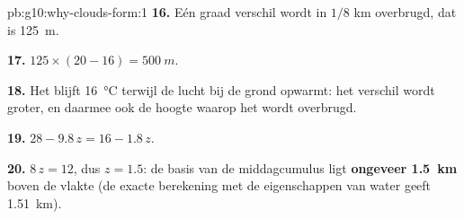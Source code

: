 \begin{solution}{pb:g10:why-clouds-form:1}
\textbf{16.} Eén graad verschil wordt in $1/8$ km overbrugd, dat is
\qty{125}{m}.

\textbf{17.} $125 \times (20 - 16) = \qty{500}{m}$.

\textbf{18.} Het  blijft \qty{16}{\degreeCelsius} terwijl de lucht bij
de grond opwarmt: het verschil wordt groter, en daarmee ook de hoogte waarop het
wordt overbrugd.

\textbf{19.} $28 - 9.8\,z = 16 - 1.8\,z$.

\textbf{20.} $8\,z = 12$, dus $z = 1.5$: de basis van de middagcumulus ligt
\textbf{ongeveer \qty{1.5}{km}} boven de vlakte (de exacte berekening met de
eigenschappen van water geeft \qty{1.51}{km}).
\end{solution}
